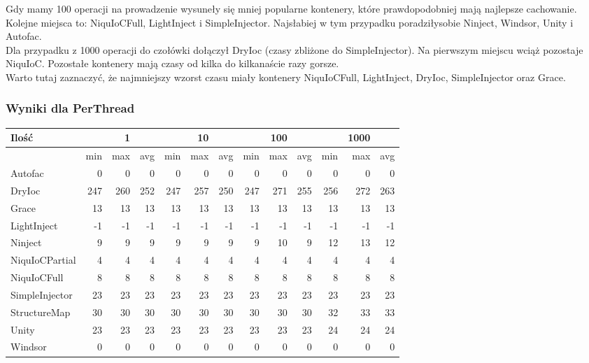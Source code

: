 \documentclass[12pt]{article}
\begin{document}
Gdy mamy 100 operacji na prowadzenie wysuneły się mniej popularne kontenery, które prawdopodobniej mają najlepsze cachowanie. Kolejne miejsca to: NiquIoCFull, LightInject i SimpleInjector. Najsłabiej w tym przypadku poradziłysobie Ninject, Windsor, Unity i Autofac.\\
Dla przypadku z 1000 operacji do czołówki dołączył DryIoc (czasy zbliżone do SimpleInjector). Na pierwszym miejscu wciąż pozostaje NiquIoC. Pozostałe kontenery mają czasy od kilka do kilkanaście razy gorsze.\\
Warto tutaj zaznaczyć, że najmniejszy wzorst czasu miały kontenery NiquIoCFull, LightInject, DryIoc, SimpleInjector oraz Grace.

\subsubsection{Wyniki dla PerThread}
\begin{center}
\begin{small}
	\begin{tabular}{ | l | r r r | r r r | r r r | r r r | }
    		\hline
     		Ilość & & 1 & & & 10 & & & 100 & & & 1000 & \\ \hline
     		 & min & max & avg & min & max & avg & min & max & avg & min & max & avg \\ \hline
    		Autofac & 0 & 0 & 0 & 0 & 0 & 0 & 0 & 0 & 0 & 0 & 0 & 0 \\ \hline
   		DryIoc & 247 & 260 & 252 & 247 & 257 & 250 & 247 & 271 & 255 & 256 & 272 & 263 \\ \hline
		Grace & 13 & 13 & 13 & 13 & 13 & 13 & 13 & 13 & 13 & 13 & 13 & 13 \\ \hline
		LightInject & -1 & -1 & -1 & -1 & -1 & -1 & -1 & -1 & -1 & -1 & -1 & -1 \\ \hline
		Ninject & 9 & 9 & 9 & 9 & 9 & 9 & 9 & 10 & 9 & 12 & 13 & 12 \\ \hline
		NiquIoCPartial & 4 & 4 & 4 & 4 & 4 & 4 & 4 & 4 & 4 & 4 & 4 & 4 \\ \hline
		NiquIoCFull & 8 & 8 & 8 & 8 & 8 & 8 & 8 & 8 & 8 & 8 & 8 & 8 \\ \hline
		SimpleInjector & 23 & 23 & 23 & 23 & 23 & 23 & 23 & 23 & 23 & 23 & 23 & 23 \\ \hline
		StructureMap & 30 & 30 & 30 & 30 & 30 & 30 & 30 & 30 & 30 & 32 & 33 & 33 \\ \hline
		Unity & 23 & 23 & 23 & 23 & 23 & 23 & 23 & 23 & 23 & 24 & 24 & 24 \\ \hline
		Windsor & 0 & 0 & 0 & 0 & 0 & 0 & 0 & 0 & 0 & 0 & 0 & 0 \\
    		\hline
  	\end{tabular}
\end{small}
\end{center}
\end{document}
